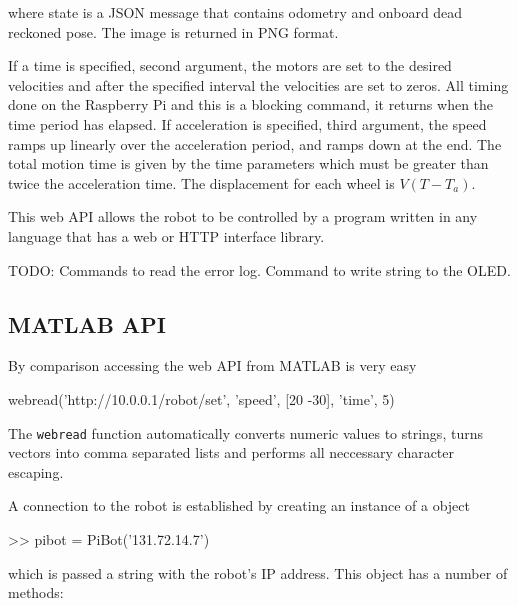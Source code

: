 \documentclass[11pt,fleqn]{article}
\begin{document}
where state is a JSON message that contains odometry and onboard dead reckoned pose.
The image is returned in PNG format.

If a time is specified, second argument, the motors are set to the desired velocities and after the specified interval the velocities are set to zeros.  All timing done on the Raspberry Pi
and this is a blocking command, it returns when the time period has elapsed.
If acceleration is specified, third argument, the speed ramps up linearly over the acceleration period, and ramps down at the end.  The total motion time is given by the time 
parameters which must be greater than twice the acceleration time.
The displacement for each wheel is $V (T - T_a)$.

This web API allows the robot to be controlled by a program written in any language that has a web or HTTP interface library.


TODO: Commands to read the error log.  Command to write string to the OLED.

\subsection{MATLAB API}

By comparison accessing the web API from MATLAB is very easy
\begin{Code}
webread('http://10.0.0.1/robot/set', 'speed', [20 -30], 'time', 5)
\end{Code}
The \texttt{webread} function automatically converts numeric values to strings,  turns vectors into comma separated lists and performs
all neccessary character escaping.


A connection to the robot is established by creating an instance of a  object
\begin{Code}
>> pibot = PiBot('131.72.14.7')
\end{Code}
which is passed a string with the robot's IP address.  This object has a number of methods:
\end{document}
